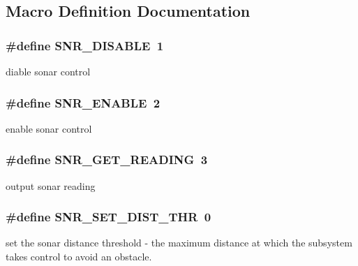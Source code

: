 \subsection{Macro Definition Documentation}
\hypertarget{group__sonar__commands_ga9b110968cd5bd961f4984c02965cf9ba}{
\subsubsection[{S\-N\-R\-\_\-\-D\-I\-S\-A\-B\-L\-E}]{\setlength{\rightskip}{0pt plus 5cm}\#define S\-N\-R\-\_\-\-D\-I\-S\-A\-B\-L\-E~1}}\label{group__sonar__commands_ga9b110968cd5bd961f4984c02965cf9ba}
diable sonar control \hypertarget{group__sonar__commands_ga994c94413393c44561f42e781da5815f}{
\subsubsection[{S\-N\-R\-\_\-\-E\-N\-A\-B\-L\-E}]{\setlength{\rightskip}{0pt plus 5cm}\#define S\-N\-R\-\_\-\-E\-N\-A\-B\-L\-E~2}}\label{group__sonar__commands_ga994c94413393c44561f42e781da5815f}
enable sonar control \hypertarget{group__sonar__commands_ga6b4b3d5c4969ca317548a1d9c8686c4f}{
\subsubsection[{S\-N\-R\-\_\-\-G\-E\-T\-\_\-\-R\-E\-A\-D\-I\-N\-G}]{\setlength{\rightskip}{0pt plus 5cm}\#define S\-N\-R\-\_\-\-G\-E\-T\-\_\-\-R\-E\-A\-D\-I\-N\-G~3}}\label{group__sonar__commands_ga6b4b3d5c4969ca317548a1d9c8686c4f}
output sonar reading \hypertarget{group__sonar__commands_gaa5d2a4af7281457c965323f4c26ea9ab}{
\subsubsection[{S\-N\-R\-\_\-\-S\-E\-T\-\_\-\-D\-I\-S\-T\-\_\-\-T\-H\-R}]{\setlength{\rightskip}{0pt plus 5cm}\#define S\-N\-R\-\_\-\-S\-E\-T\-\_\-\-D\-I\-S\-T\-\_\-\-T\-H\-R~0}}\label{group__sonar__commands_gaa5d2a4af7281457c965323f4c26ea9ab}
set the sonar distance threshold -\/ the maximum distance at which the subsystem takes control to avoid an obstacle. 